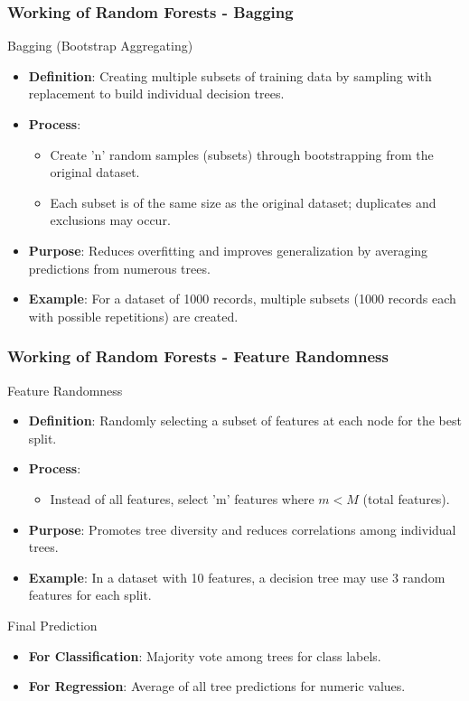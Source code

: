 \documentclass[aspectratio=169]{beamer}
\begin{document}
\begin{frame}[fragile]
    \frametitle{Working of Random Forests - Bagging}
    \begin{block}{Bagging (Bootstrap Aggregating)}
        \begin{itemize}
            \item \textbf{Definition}: Creating multiple subsets of training data by sampling with replacement to build individual decision trees.
            \item \textbf{Process}:
            \begin{itemize}
                \item Create 'n' random samples (subsets) through bootstrapping from the original dataset.
                \item Each subset is of the same size as the original dataset; duplicates and exclusions may occur.
            \end{itemize}
            \item \textbf{Purpose}: Reduces overfitting and improves generalization by averaging predictions from numerous trees.
            \item \textbf{Example}: For a dataset of 1000 records, multiple subsets (1000 records each with possible repetitions) are created.
        \end{itemize}
    \end{block}
\end{frame}

\begin{frame}[fragile]
    \frametitle{Working of Random Forests - Feature Randomness}
    \begin{block}{Feature Randomness}
        \begin{itemize}
            \item \textbf{Definition}: Randomly selecting a subset of features at each node for the best split.
            \item \textbf{Process}:
            \begin{itemize}
                \item Instead of all features, select 'm' features where \( m < M \) (total features).
            \end{itemize}
            \item \textbf{Purpose}: Promotes tree diversity and reduces correlations among individual trees.
            \item \textbf{Example}: In a dataset with 10 features, a decision tree may use 3 random features for each split.
        \end{itemize}
    \end{block}

    \begin{block}{Final Prediction}
        \begin{itemize}
            \item \textbf{For Classification}: Majority vote among trees for class labels.
            \item \textbf{For Regression}: Average of all tree predictions for numeric values.
        \end{itemize}
    \end{block}
\end{frame}
\end{document}
